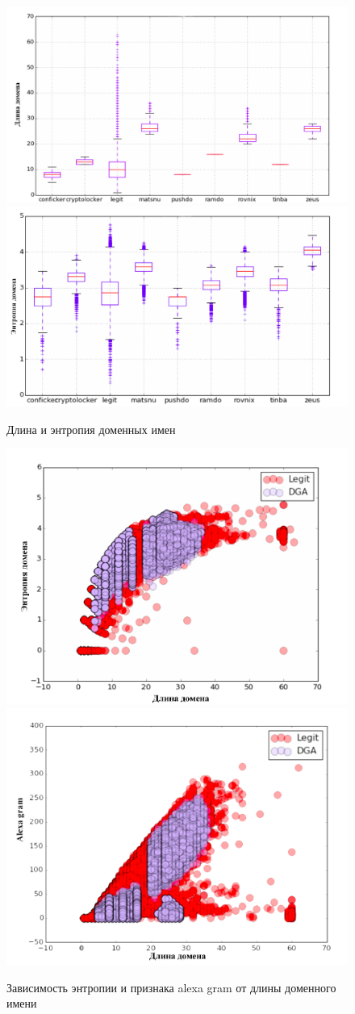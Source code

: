     \begin{figure}[H]
        \left
        \includegraphics[width=0.5\linewidth]{images/linear_class/length.png}
        \right
        \includegraphics[width=0.5\linewidth]{images/linear_class/entropy.png} \label{length_entropy}
        \caption{Длина и энтропия доменных имен}
    \end{figure}
    \begin{figure}[H]
        \left
        \includegraphics[width=0.5\linewidth]{images/linear_class/entropy2.png}
        \right
        \includegraphics[width=0.5\linewidth]{images/linear_class/alexa_gramm.png}
        \caption{Зависимость энтропии и признака alexa gram от длины доменного имени} \label{entropy_alexa}
    \end{figure}
